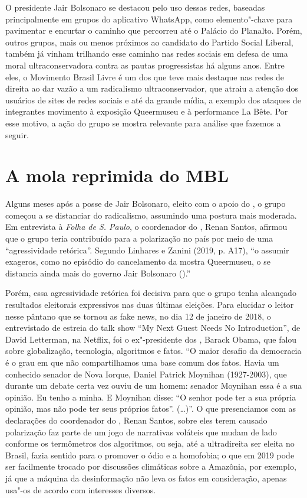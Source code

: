 O presidente Jair Bolsonaro se destacou pelo uso dessas redes, baseadas
principalmente em grupos do aplicativo WhatsApp, como elemento"-chave
para pavimentar e encurtar o caminho que percorreu até o Palácio do
Planalto. Porém, outros grupos, mais ou menos próximos ao candidato do
Partido Social Liberal, também já vinham trilhando esse caminho nas
redes sociais em defesa de uma moral ultraconservadora contra as pautas
progressistas há alguns anos. Entre eles, o Movimento Brasil Livre é um
dos que teve mais destaque nas redes de direita ao dar vazão a um
radicalismo ultraconservador, que atraiu a atenção dos usuários de sites
de redes sociais e até da grande mídia, a exemplo dos ataques de
integrantes movimento à exposição Queermuseu e à performance La Bête.
Por esse motivo, a ação do grupo se mostra relevante para análise que
fazemos a seguir.

\section{A mola reprimida do MBL}

Alguns meses após a posse de Jair Bolsonaro, eleito com o apoio do ,
o grupo começou a se distanciar do radicalismo, assumindo uma postura
mais moderada. Em entrevista à \emph{Folha de S. Paulo}, o coordenador
do , Renan Santos, afirmou que o grupo teria contribuído para a
polarização no país por meio de uma ``agressividade retórica''. Segundo
Linhares e Zanini (2019, p. A17), ``o assumir exageros, como no episódio
do cancelamento da mostra Queermuseu, o  se distancia ainda mais do
governo Jair Bolsonaro ().''

Porém, essa agressividade retórica foi decisiva para que o grupo tenha
alcançado resultados eleitorais expressivos nas duas últimas eleições.
Para elucidar o leitor nesse pântano que se tornou as fake news, no dia
12 de janeiro de 2018, o entrevistado de estreia do talk show ``My Next
Guest Needs No Introduction'', de David Letterman, na Netflix, foi o
ex"-presidente dos , Barack Obama, que falou sobre globalização,
tecnologia, algoritmos e fatos. ``O maior desafio da democracia é o grau
em que não compartilhamos uma base comum dos fatos. Havia um conhecido
senador de Nova Iorque, Daniel Patrick Moynihan (1927-2003), que durante
um debate certa vez ouviu de um homem: senador Moynihan essa é a sua
opinião. Eu tenho a minha. E Moynihan disse: ``O senhor pode ter a sua
própria opinião, mas não pode ter seus próprios fatos''. (\ldots{})''. O que
presenciamos com as declarações do coordenador do , Renan Santos,
sobre eles terem causado polarização faz parte de um jogo de narrativas
voláteis que mudam de lado conforme os termômetros dos algoritmos, ou
seja, até a ultradireita ser eleita no Brasil, fazia sentido para o 
promover o ódio e a homofobia; o que em 2019 pode ser facilmente trocado
por discussões climáticas sobre a Amazônia, por exemplo, já que a
máquina da desinformação não leva os fatos em consideração, apenas
usa"-os de acordo com interesses diversos.

